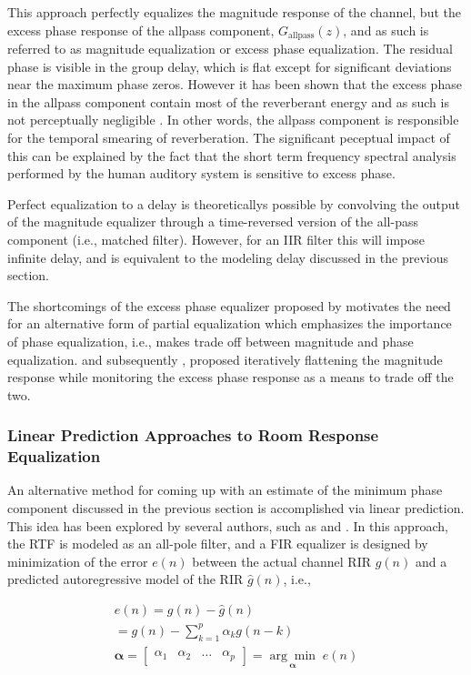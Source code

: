 This approach perfectly equalizes the magnitude response of the channel, but the excess phase response of the allpass component, $G_{\mathrm{allpass}}(z)$,  and as such is referred to as magnitude equalization or excess phase equalization. The residual phase is visible in the group delay, which is flat except for significant deviations near the maximum phase zeros. However it has been shown that the excess phase in the allpass component contain most of the reverberant energy and as such is not perceptually negligible \citep{johansen1996excess}. In other words, the allpass component is responsible for the temporal smearing of reverberation. The significant peceptual impact of this can be explained by the fact that the short term frequency spectral analysis performed by the human auditory system is sensitive to excess phase.

Perfect equalization to a delay is theoreticallys possible by convolving the output of the magnitude equalizer through a time-reversed version of the all-pass component (i.e., matched filter). However, for an IIR filter this will impose infinite delay, and is equivalent to the modeling delay discussed in the previous section.

The shortcomings of the excess phase equalizer proposed by \cite{neely1979invertibility} motivates the need for an alternative form of partial equalization which emphasizes the importance of phase equalization, i.e., makes trade off between magnitude and phase equalization. \cite{radlovic2000nonminimum} and subsequently \cite{maamar2006partial}, proposed iteratively flattening the magnitude response while monitoring the excess phase response as a means to trade off the two.

\subsubsection{Linear Prediction Approaches to Room Response Equalization}

An alternative method for coming up with an estimate of the minimum phase component discussed in the previous section is accomplished via linear prediction. This idea has been explored by several authors, such as \cite{mourjopoulos1991pole} and \cite{haneda1997multiple}. In this approach, the RTF is modeled as an all-pole filter, and a FIR equalizer is designed by minimization of the error $e(n)$ between the actual channel RIR $g(n)$ and a predicted autoregressive model of the RIR $\hat{g}(n)$, i.e.,

\begin{eqnarray}
	e(n)= g(n) - \hat{g}(n) \\
	=  g(n) - \sum_{k=1}^{p}\alpha_k g(n-k) \\
	\boldsymbol{\alpha}=\begin{bmatrix} \alpha_1 & \alpha_2 & \dots & \alpha_p \end{bmatrix} = \underset{\boldsymbol{\alpha}}{\arg\min}\;e(n)
\end{eqnarray}

